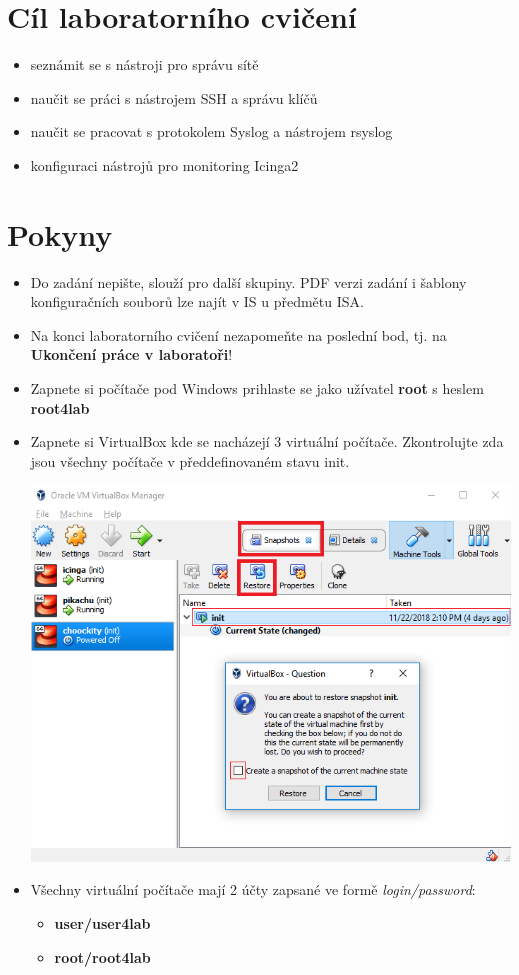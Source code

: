 %
\section*{Cíl laboratorního cvičení}
\begin{itemize}
  \item seznámit se s nástroji pro správu sítě
  \item naučit se práci s nástrojem SSH a správu klíčů 
  \item naučit se pracovat s protokolem Syslog a nástrojem rsyslog
  \item konfiguraci nástrojů pro monitoring Icinga2
\end{itemize}

\section*{Pokyny}
\begin{itemize}
  \item Do zadání nepište, slouží pro další skupiny. PDF verzi zadání
  i šablony konfiguračních souborů lze najít v IS u předmětu ISA.
  
  \item Na konci laboratorního cvičení nezapomeňte na poslední bod,
  tj. na {\bf Ukončení práce v laboratoři}!
  
  \item Zapnete si počítače pod Windows prihlaste se jako užívatel \textbf{root} s heslem \textbf{root4lab}
  \item Zapnete si VirtualBox kde se nacházejí 3 virtuální počítače. Zkontrolujte zda jsou všechny počítače v předdefinovaném stavu init.
  
  \includegraphics[width=\linewidth]{files/init.PNG}
  \item Všechny virtuální počítače mají 2 účty zapsané ve formě \textit{login/password}:
            \begin{itemize}
                \item \textbf{user/user4lab}
                \item \textbf{root/root4lab}
            \end{itemize}
\end{itemize}

